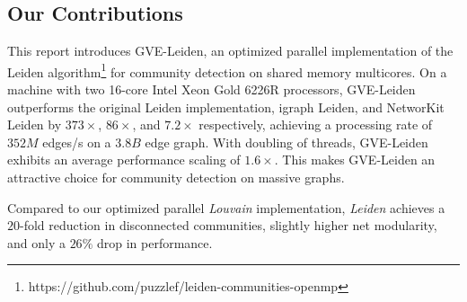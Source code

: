 






\subsection{Our Contributions}

This report introduces GVE-Leiden, an optimized parallel implementation of the Leiden algorithm\footnote{https://github.com/puzzlef/leiden-communities-openmp} for community detection on shared memory multicores. On a machine with two 16-core Intel Xeon Gold 6226R processors, GVE-Leiden outperforms the original Leiden implementation, igraph Leiden, and NetworKit Leiden by $373\times$, $86\times$, and $7.2\times$ respectively, achieving a processing rate of $352 M$ edges/s on a $3.8 B$ edge graph. With doubling of threads, GVE-Leiden exhibits an average performance scaling of $1.6\times$. This makes GVE-Leiden an attractive choice for community detection on massive graphs.

Compared to our optimized parallel \textit{Louvain} implementation, \textit{Leiden} achieves a $20$-fold reduction in disconnected communities, slightly higher net modularity, and only a $26\%$ drop in performance. 




